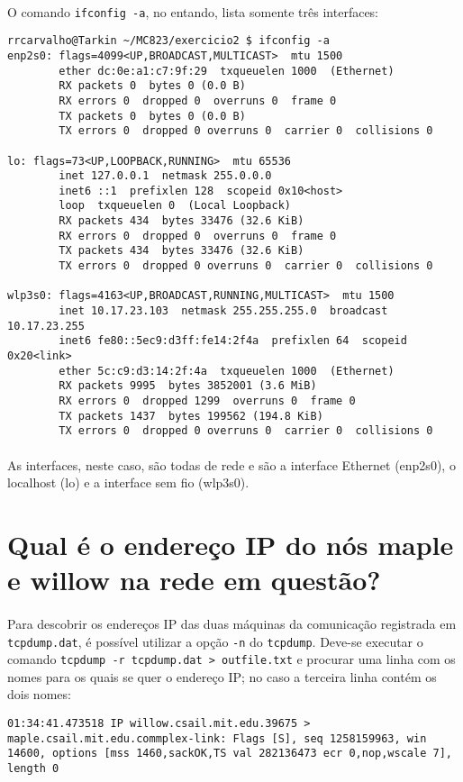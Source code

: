 \documentclass[a4paper,10pt,oneside,final,titlepage,onecolumn]{article}
\begin{document}
\paragraph{}O comando \verb|ifconfig -a|, no entando, lista somente três interfaces:
\begin{lstlisting}
rrcarvalho@Tarkin ~/MC823/exercicio2 $ ifconfig -a
enp2s0: flags=4099<UP,BROADCAST,MULTICAST>  mtu 1500
        ether dc:0e:a1:c7:9f:29  txqueuelen 1000  (Ethernet)
        RX packets 0  bytes 0 (0.0 B)
        RX errors 0  dropped 0  overruns 0  frame 0
        TX packets 0  bytes 0 (0.0 B)
        TX errors 0  dropped 0 overruns 0  carrier 0  collisions 0

lo: flags=73<UP,LOOPBACK,RUNNING>  mtu 65536
        inet 127.0.0.1  netmask 255.0.0.0
        inet6 ::1  prefixlen 128  scopeid 0x10<host>
        loop  txqueuelen 0  (Local Loopback)
        RX packets 434  bytes 33476 (32.6 KiB)
        RX errors 0  dropped 0  overruns 0  frame 0
        TX packets 434  bytes 33476 (32.6 KiB)
        TX errors 0  dropped 0 overruns 0  carrier 0  collisions 0

wlp3s0: flags=4163<UP,BROADCAST,RUNNING,MULTICAST>  mtu 1500
        inet 10.17.23.103  netmask 255.255.255.0  broadcast 10.17.23.255
        inet6 fe80::5ec9:d3ff:fe14:2f4a  prefixlen 64  scopeid 0x20<link>
        ether 5c:c9:d3:14:2f:4a  txqueuelen 1000  (Ethernet)
        RX packets 9995  bytes 3852001 (3.6 MiB)
        RX errors 0  dropped 1299  overruns 0  frame 0
        TX packets 1437  bytes 199562 (194.8 KiB)
        TX errors 0  dropped 0 overruns 0  carrier 0  collisions 0
\end{lstlisting}
\paragraph{}As interfaces, neste caso, são todas de rede e são a interface Ethernet (enp2s0), o localhost (lo) e a interface sem fio (wlp3s0).



\section{Qual é o endereço IP do nós maple e willow na rede em questão? }
\paragraph{}Para descobrir os endereços IP das duas máquinas da comunicação registrada em \verb|tcpdump.dat|, é possível utilizar a opção \verb|-n| do \verb|tcpdump|. Deve-se executar o comando \verb|tcpdump -r tcpdump.dat > outfile.txt| e procurar uma linha com os nomes para os quais se quer o endereço IP; no caso a terceira linha contém os dois nomes:
\begin{lstlisting}
01:34:41.473518 IP willow.csail.mit.edu.39675 > maple.csail.mit.edu.commplex-link: Flags [S], seq 1258159963, win 14600, options [mss 1460,sackOK,TS val 282136473 ecr 0,nop,wscale 7], length 0
\end{lstlisting}
\end{document}
